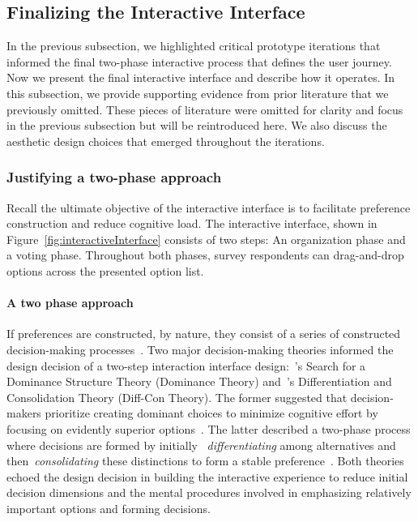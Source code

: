 \subsection{Finalizing the Interactive Interface}
\label{sec:finalInterfaceDesign}
In the previous subsection, we highlighted critical prototype iterations that informed the final two-phase interactive process that defines the user journey. Now we present the final interactive interface and describe how it operates. In this subsection, we provide supporting evidence from prior literature that we previously omitted. These pieces of literature were omitted for clarity and focus in the previous subsection but will be reintroduced here. We also discuss the aesthetic design choices that emerged throughout the iterations.

\subsubsection{Justifying a two-phase approach}
Recall the ultimate objective of the interactive interface is to facilitate preference construction and reduce cognitive load. The interactive interface, shown in Figure~\ref{fig:interactiveInterface} consists of two steps: An organization phase and a voting phase. Throughout both phases, survey respondents can drag-and-drop options across the presented option list.

\paragraph{A two phase approach}
If preferences are constructed, by nature, they consist of a series of constructed decision-making processes~\cite{lichtensteinConstructionPreference2006}. Two major decision-making theories informed the design decision of a two-step interaction interface design:~\textcite{montgomeryDecisionRulesSearch1983}'s Search for a Dominance Structure Theory (Dominance Theory) and~\textcite{svensonDifferentiationConsolidationTheory1992}'s Differentiation and Consolidation Theory (Diff-Con Theory). The former suggested that decision-makers prioritize creating dominant choices to minimize cognitive effort by focusing on evidently superior options~\cite{montgomeryDecisionRulesSearch1983}. The latter described a two-phase process where decisions are formed by initially ~\textit{differentiating} among alternatives and then~\textit{consolidating} these distinctions to form a stable preference~\cite{svensonDifferentiationConsolidationTheory1992}. Both theories echoed the design decision in building the interactive experience to reduce initial decision dimensions and the mental procedures involved in emphasizing relatively important options and forming decisions.

